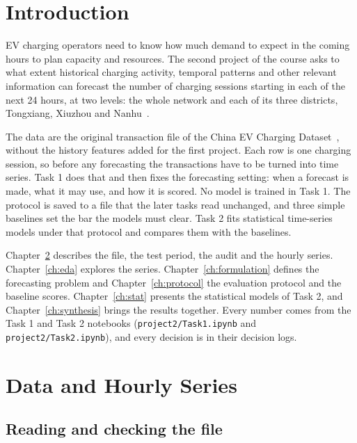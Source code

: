 \documentclass[12pt,a4paper,openany]{report}
\begin{document}
\chapter{Introduction}\label{ch:intro}

\ac{EV} charging operators need to know how much demand to expect in the coming hours to plan capacity and
resources. The second project of the course asks to what extent historical charging activity, temporal patterns and
other relevant information can forecast the number of charging sessions starting in each of the next 24 hours, at
two levels: the whole network and each of its three districts, Tongxiang, Xiuzhou and Nanhu~\cite{brief}.

The data are the original transaction file of the China EV Charging Dataset~\cite{zhang2025}, without the history
features added for the first project. Each row is one charging session, so before any forecasting the transactions
have to be turned into time series. Task 1 does that and then fixes the forecasting setting: when a forecast is
made, what it may use, and how it is scored. No model is trained in Task 1. The protocol is saved to a file that the
later tasks read unchanged, and three simple baselines set the bar the models must clear. Task 2 fits statistical
time-series models under that protocol and compares them with the baselines.

Chapter~\ref{ch:data} describes the file, the test period, the audit and the hourly series. Chapter~\ref{ch:eda}
explores the series. Chapter~\ref{ch:formulation} defines the forecasting problem and Chapter~\ref{ch:protocol} the
evaluation protocol and the baseline scores. Chapter~\ref{ch:stat} presents the statistical models of Task 2, and
Chapter~\ref{ch:synthesis} brings the results together. Every number comes from the Task 1 and Task 2 notebooks
(\texttt{project2/Task1.ipynb} and \texttt{project2/Task2.ipynb}), and every decision is in their decision logs.

\chapter{Data and Hourly Series}\label{ch:data}

\section{Reading and checking the file}\label{sec:read}
\end{document}
